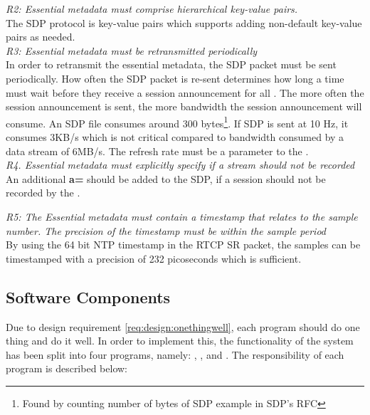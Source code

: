 \noindent \textit{R2: Essential metadata must comprise hierarchical key-value pairs.}\\
The SDP protocol is key-value pairs which supports adding non-default key-value pairs as needed. \\

\noindent \textit{R3: Essential metadata must be retransmitted periodically}\\
In order to retransmit the essential metadata, the SDP packet must be sent periodically. How often the SDP packet is re-sent determines how long a time  must wait before they receive a session announcement for all . The more often the session announcement is sent, the more bandwidth the session announcement will consume. An SDP file consumes around 300 bytes\footnote{Found by counting number of bytes of SDP example in SDP's RFC}. If SDP is sent at 10 Hz, it consumes 3KB/s which is not critical compared to bandwidth consumed by a data stream of 6MB/s. The refresh rate must be a parameter to the . \\

\textit{R4. Essential metadata must explicitly specify if a stream should not be recorded}\\
An additional \textbf{a=} should be added to the SDP, if a session should not be recorded by the \hist{}.

\noindent \textit{R5: The Essential metadata must contain a timestamp that relates to the sample number. The precision of the timestamp must be within the sample period}\\
By using the 64 bit NTP timestamp in the RTCP SR packet, the samples can be timestamped with a precision of 232 picoseconds\citep{RFC5905} which is sufficient.



\subsection{Software Components}
Due to design requirement \ref{req:design:onethingwell}, each program should do one thing and do it well.
In order to implement this, the functionality of the system has been split into four programs, namely: \pub{}, \sub{}, \pro{} and \con{}. The responsibility of each program is described below:


